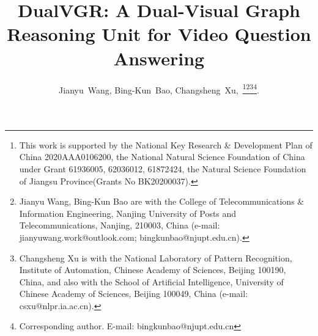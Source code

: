 \documentclass[journal]{IEEEtran}
\begin{document}
\title{DualVGR: A Dual-Visual Graph Reasoning Unit for Video Question Answering}
\author{Jianyu~Wang,
        Bing-Kun~Bao, Changsheng~Xu,~\thanks{This work is supported by the National Key Research \& Development Plan of China  2020AAA0106200, the National Natural Science Foundation of China under Grant 61936005, 62036012, 61872424, the Natural Science Foundation of Jiangsu Province(Grants No BK20200037).}\thanks{Jianyu Wang, Bing-Kun Bao are with the College of Telecommunications \& Information Engineering, Nanjing University of Posts and Telecommunications, Nanjing, 210003, China (e-mail: jianyuwang.work@outlook.com; bingkunbao@njupt.edu.cn).}\thanks{Changsheng Xu is with the National Laboratory of Pattern Recognition, Institute of Automation, Chinese Academy of Sciences, Beijing 100190, China, and also with the School of Artificial Intelligence, University of Chinese Academy of Sciences, Beijing 100049, China (e-mail: csxu@nlpr.ia.ac.cn).}\thanks{ Corresponding author. E-mail: bingkunbao@njupt.edu.cn}.}







\end{document}

